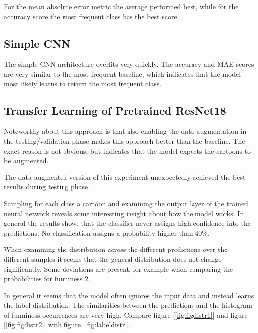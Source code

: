 \documentclass[draft,final,oneside]{vutinfth} %
\begin{document}
For the mean absolute error metric the average performed best, while for the accuracy score the most frequent class has the best score.

\subsection{Simple CNN}
The simple CNN architecture overfits very quickly. The accuracy and MAE scores are very similar to the most frequent baseline, which indicates that the model most likely learns to return the most frequent class.

\subsection{Transfer Learning of Pretrained ResNet18}
Noteworthy about this approach is that also enabling the data augmentation in the testing/validation phase makes this approach better than the baseline. The exact reason is not obvious, but indicates that the model expects the cartoons to be augmented.

The data augmented version of this experiment unexpectedly achieved the best results during testing phase.

Sampling for each class a cartoon and examining the output layer of the trained neural network reveals some interesting insight about how the model works. In general the results show, that the classifier never assigns high confidence into the predictions. No classification assigns a probability higher than 40\%.

When examining the distribution across the different predictions over the different samples it seems that the general distribution does not change significantly. Some deviations are present, for example when comparing the probabilities for funniness 2.

In general it seems that the model often ignores the input data and instead learns the label distribution. The similarities between the predictions and the histogram of funniness occurrences are very high. Compare figure [\ref{fig:figdistr1}] and figure [\ref{fig:figdistr2}] with figure [\ref{fig:labeldistr}].
\end{document}
